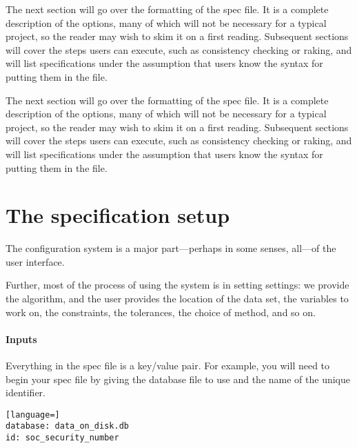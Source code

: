 \documentclass{article}
\begin{document}
The next section will go over the formatting of the spec file. It is a complete
description of the options, many of which will not be necessary for a typical project, so
the reader may wish to skim it on a first reading. Subsequent sections will cover the 
steps users can execute, such as consistency checking or raking, and will list
specifications under the assumption that users know the syntax for putting them in the
file.

The next section will go over the formatting of the spec file. It is a complete
description of the options, many of which will not be necessary for a typical project, so
the reader may wish to skim it on a first reading. Subsequent sections will cover the 
steps users can execute, such as consistency checking or raking, and will list
specifications under the assumption that users know the syntax for putting them in the
file.


\section{The specification setup}\label{specsyntax}
The configuration system is a major part---perhaps in some senses, all---of the
user interface. 

Further, most of the process of using the system is in setting
settings: we provide the algorithm, and the user provides the location of the
data set, the variables to work on, the constraints, the tolerances, the choice
of method, and so on. 

\paragraph{Inputs} 
Everything in the spec file is a key/value pair. For example, you will need to begin
your spec file by giving the database file to use and the name of the unique identifier.

\begin{lstlisting}[language=]
database: data_on_disk.db
id: soc_security_number
\end{lstlisting}
\end{document}
